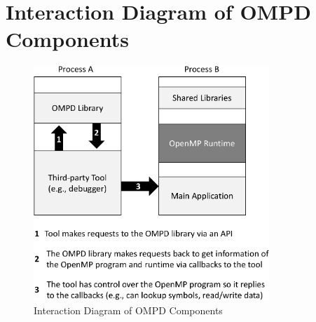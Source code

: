 %
%
%
%
%
%
%
%
%
%


\chapter{Interaction Diagram of OMPD Components}
\label{chap:ompd_diagram}


   \begin{figure}[h]
    \centering
        \includegraphics[width=3.5in]{appendices/ompd_diagram.pdf}
    \caption{Interaction Diagram of OMPD Components}
    \label{fig:ompd_diagram}
\end{figure}

